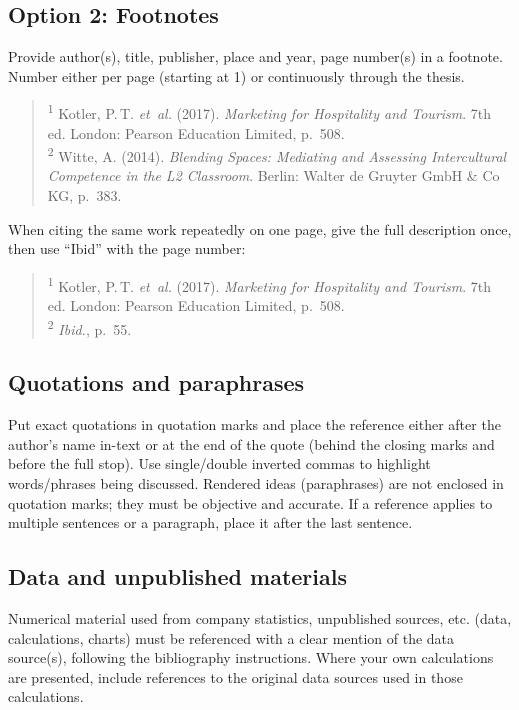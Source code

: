 \subsection*{Option 2: Footnotes}
Provide author(s), title, publisher, place and year, page number(s) in a footnote. Number either per page (starting at 1) or continuously through the thesis.
\begin{quote}
\textsuperscript{1} Kotler, P.\,T. \emph{et~al.} (2017). \textit{Marketing for Hospitality and Tourism}. 7th ed. London: Pearson Education Limited, p.~508.\\
\textsuperscript{2} Witte, A. (2014). \textit{Blending Spaces: Mediating and Assessing Intercultural Competence in the L2 Classroom}. Berlin: Walter de Gruyter GmbH \& Co KG, p.~383.
\end{quote}
When citing the same work repeatedly on one page, give the full description once, then use ``Ibid'' with the page number:
\begin{quote}
\textsuperscript{1} Kotler, P.\,T. \emph{et~al.} (2017). \textit{Marketing for Hospitality and Tourism}. 7th ed. London: Pearson Education Limited, p.~508.\\
\textsuperscript{2} \textit{Ibid.}, p.~55.
\end{quote}

\subsection*{Quotations and paraphrases}
Put exact quotations in quotation marks and place the reference either after the author’s name in-text or at the end of the quote (behind the closing marks and before the full stop). Use single/double inverted commas to highlight words/phrases being discussed. Rendered ideas (paraphrases) are not enclosed in quotation marks; they must be objective and accurate. If a reference applies to multiple sentences or a paragraph, place it after the last sentence.

\subsection*{Data and unpublished materials}
Numerical material used from company statistics, unpublished sources, etc. (data, calculations, charts) must be referenced with a clear mention of the data source(s), following the bibliography instructions. Where your own calculations are presented, include references to the original data sources used in those calculations.

